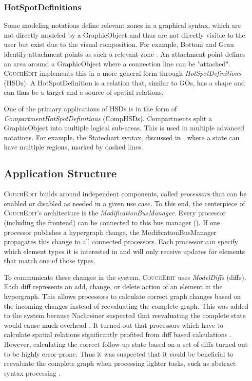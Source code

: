 \subsubsection{HotSpotDefinitions}
\label{sec:hotspotdefinitions}
Some modeling notations define relevant zones in a graphical syntax, which are not directly modeled by a GraphicObject and thus are not directly visible to the user but exist due to the visual composition. For example, Bottoni and Grau identify attachment points as such a relevant zone \cite{bottoni_suite_2004}. An attachment point defines an area around a GraphicObject where a connection line can be "attached". \textsc{CouchEdit} implements this in a more general form through \emph{HotSpotDefinitions} (HSDs). A HotSpotDefinition is a relation that, similar to GOs, has a shape and can thus be a target and a source of spatial relations.

One of the primary applications of HSDs is in the form of \emph{CompartmentHotSpotDefinitions} (CompHSDs). Compartments split a GraphicObject into multiple logical sub-areas. This is used in multiple advanced notations. For example, the Statechart syntax, discussed in , where a state can have multiple regions, marked by dashed lines. 

\subsection{Application Structure}
\textsc{CouchEdit} builds around independent components, called \emph{processors} that can be enabled or disabled as needed in a given use case. To this end, the centerpiece of \textsc{CouchEdit}'s architecture is the \emph{ModificationBusManager}. Every processor (including the frontend) can be connected to this bus manager (). If one processor publishes a hypergraph change, the ModificationBusManager propagates this change to all connected processors. Each processor can specify which element types it is interested in and will only receive updates for elements that match one of those types. 

To communicate these changes in the system, \textsc{CouchEdit} uses \emph{ModelDiffs} (diffs). Each diff represents an add, change, or delete action of an element in the hypergraph. This allows processors to calculate correct graph changes based on the incoming changes instead of reevaluating the complete graph. This was added to the system because Nachreiner suspected that reevaluating the complete state would cause much overhead \cite{nachreiner_couchedit_2020}. It turned out that processors which have to calculate spatial relations significantly profited from diff based calculations  \cite{nachreiner_couchedit_2020}. However, calculating the correct follow-up state based on a set of diffs turned out to be highly error-prone. Thus it was suspected that it could be beneficial to reevaluate the complete graph when processing lighter tasks, such as abstract syntax processing \cite{nachreiner_couchedit_2020}.

